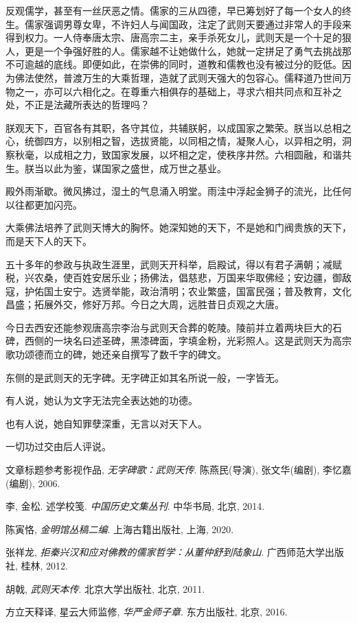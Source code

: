 \documentclass[UTF8,openany]{ctexbook}
\begin{document}
反观儒学，甚至有一丝厌恶之情。儒家的三从四德，早已筹划好了每一个女人的终生。儒家强调男尊女卑，不许妇人与闻国政，\cite{ref3}注定了武则天要通过非常人的手段来得到权力。一人侍奉唐太宗、唐高宗二主，亲手杀死女儿，武则天是一个十足的狠人，更是一个争强好胜的人。儒家越不让她做什么，她就一定拼足了勇气去挑战那不可逾越的底线。即便如此，在崇佛的同时，道教和儒教也没有被过分的贬低。因为佛法使然，普渡万生的大乘哲理，造就了武则天强大的包容心。儒释道乃世间万物之一，亦可以六相化之。在尊重六相俱存的基础上，寻求六相共同点和互补之处，不正是法藏所表达的哲理吗？

朕观天下，百官各有其职，各守其位，共辅朕躬，以成国家之繁荣。朕当以总相之心，统御四方，以别相之智，选拔贤能，以同相之情，凝聚人心，以异相之明，洞察秋毫，以成相之力，致国家发展，以坏相之定，使秩序井然。六相圆融，和谐共生。朕当以此为鉴，谋国家之盛世，成万世之基业。

殿外雨渐歇。微风拂过，湿土的气息涌入明堂。雨洼中浮起金狮子的流光，比任何以往都更加闪亮。

大乘佛法培养了武则天博大的胸怀。她深知她的天下，不是她和门阀贵族的天下，而是天下人的天下。

五十多年的参政与执政生涯里，武则天开科举，启殿试，得以有君子满朝；减赋税，兴农桑，使百姓安居乐业；扬佛法，倡慈悲，万国来华取佛经；安边疆，御敌寇，护佑国土安宁。选贤举能，政治清明；农业繁盛，国富民强；普及教育，文化昌盛；拓展外交，修好万邦。今日之大周，远胜昔日贞观之大唐。

今日去西安还能参观唐高宗李治与武则天合葬的乾陵。陵前并立着两块巨大的石碑，西侧的一块名曰述圣碑，黑漆碑面，字填金粉，光彩照人。这是武则天为高宗歌功颂德而立的碑，她还亲自撰写了数千字的碑文。 

东侧的是武则天的无字碑。无字碑正如其名所说一般，一字皆无。

有人说，她认为文字无法完全表达她的功德。

也有人说，她自知罪孽深重，无言以对天下人。

一切功过交由后人评说。

\newpage

\begin{thebibliography}{1}

	文章标题参考影视作品, {\it{无字碑歌：武则天传}}. 陈燕民(导演), 张文华(编剧), 李忆嘉(编剧), 2006.

  李, 金松. 述学校笺. {\it{中国历史文集丛刊}}. 中华书局, 北京, 2014.

	陈寅恪, {\it{金明馆丛稿二编}}. 上海古籍出版社, 上海, 2020.

	张祥龙, {\it{拒秦兴汉和应对佛教的儒家哲学：从董仲舒到陆象山}}. 广西师范大学出版社, 桂林, 2012.

  胡戟, {\it{武则天本传}}. 北京大学出版社, 北京, 2011.

	方立天释译, 星云大师监修, {\it{华严金师子章}}. 东方出版社, 北京, 2016.

  
  

\end{thebibliography}
\end{document}
